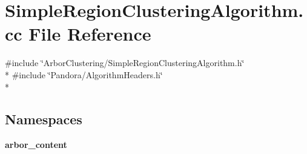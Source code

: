 \section{Simple\+Region\+Clustering\+Algorithm.\+cc File Reference}
\label{SimpleRegionClusteringAlgorithm_8cc}
{\ttfamily \#include \char`\"{}Arbor\+Clustering/\+Simple\+Region\+Clustering\+Algorithm.\+h\char`\"{}}\\*
{\ttfamily \#include \char`\"{}Pandora/\+Algorithm\+Headers.\+h\char`\"{}}\\*
\subsection*{Namespaces}
\begin{DoxyCompactItemize}
\item 
 {\bf arbor\+\_\+content}
\end{DoxyCompactItemize}

